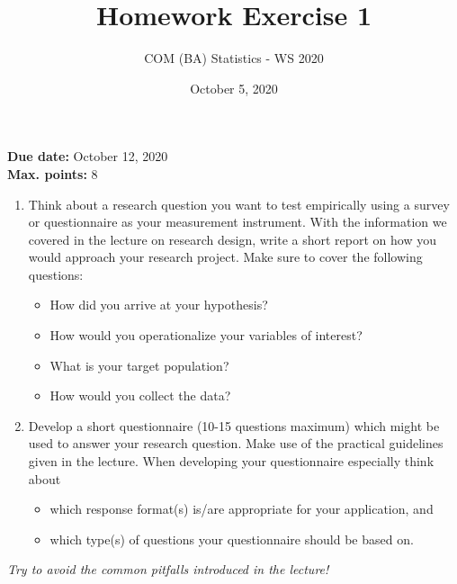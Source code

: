 \documentclass[a4paper, fleqn]{article}
\title{Homework Exercise 1}
\author{COM (BA) Statistics - WS 2020}
\date{October 5, 2020}
\begin{document}
\maketitle
\thispagestyle{empty}

\noindent
\textbf{Due date:} October 12, 2020 \\
\textbf{Max. points:} 8 \\

\begin{enumerate}
  \item Think about a research question you want to test empirically using a survey or questionnaire as your measurement instrument. With the information we covered in the lecture on research design, write a short report on how you would approach your research project. Make sure to cover the following questions: 
    \begin{itemize}
      \item How did you arrive at your hypothesis?
      \item How would you operationalize your variables of interest?
      \item What is your target population?
      \item How would you collect the data?
    \end{itemize}

  \vspace{1em}
  \item Develop a short questionnaire (10-15 questions maximum) which might be used to answer your research question. Make use of the practical guidelines given in the lecture. When developing your questionnaire especially think about
    \begin{itemize}
      \item which response format(s) is/are appropriate for your application, and 
      \item which type(s) of questions your questionnaire should be based on. 
    \end{itemize}
\end{enumerate}

\vspace{2em}
\textit{Try to avoid the common pitfalls introduced in the lecture!}
\end{document}
